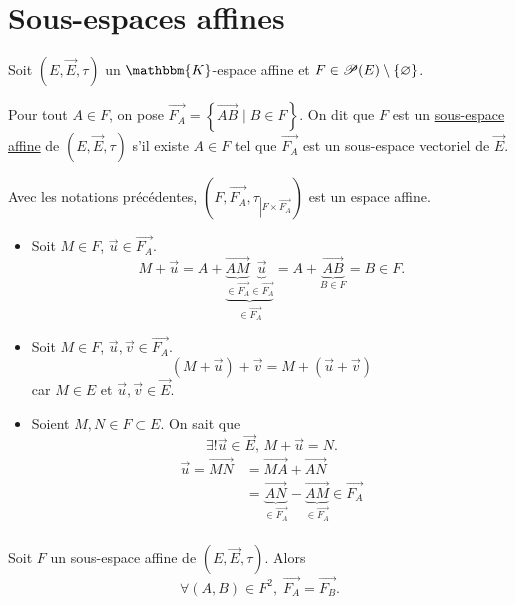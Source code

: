\part{Sous-espaces affines}

\begin{defn}
	Soit $\left( E, \vec{E}, \tau \right)$ un $\mathbbm{K}$-espace affine et $F \in \mathcal{P}(E) \setminus \{\varnothing\}$.

	Pour tout $A \in F$, on pose $\vec{F_A} = \left\{\vec{AB}  \mid  B \in F\right\}$. On dit que $F$ est un \underline{sous-espace affine} de $\left( E, \vec{E}, \tau \right)$ s'il existe $A \in F$ tel que $\vec{F_A}$ est un sous-espace vectoriel de $\vec{E}$.
\end{defn}

\begin{prop}
	Avec les notations précédentes, $\left( F, \vec{F_A}, \tau_{\left|F \times \vec{F_A}\right.} \right)$ est un espace affine.
\end{prop}

\begin{prv}
	\begin{itemize}
		\item Soit $M \in F$, $\vec{u} \in \vec{F_A}$. \[
				M + \vec{u} = A + \underbrace{\underbrace{\vec{AM}}_{\displaystyle\in \vec{F_A}} \underbrace{\vec{u}}_{\displaystyle\in \vec{F_A}}}_{\displaystyle \in \vec{F_A}} = A + \underbrace{\vec{AB}}_{B \in F} = B \in F.
			\]
		\item Soit $M \in F$, $\vec{u}, \vec{v} \in \vec{F_A}$. \[
					\left(M + \vec{u}\right) + \vec{v} = M + \left(\vec{u} + \vec{v}\right)
			\] car $M \in E$ et $\vec{u}, \vec{v} \in \vec{E}$.
		\item Soient $M,N \in F \subset E$. On sait que \[
				\exists ! \vec{u} \in \vec{E},\, M + \vec{u} = N.
			\]
			\begin{align*}
				\vec{u} = \vec{MN} &= \vec{MA} + \vec{AN}\\
				&= \underbrace{\vec{AN}}_{\displaystyle\in \vec{F_A}} - \underbrace{\vec{AM}}_{\displaystyle\in  \vec{F_A}} \in \vec{F_A} \\
			\end{align*}
	\end{itemize}
\end{prv}

\begin{prop}
	Soit $F$ un sous-espace affine de $\left( E, \vec{E}, \tau \right)$. Alors \[
		\forall (A,B) \in F^2,\; \vec{F_A} = \vec{F_B}.
	\]
\end{prop}

